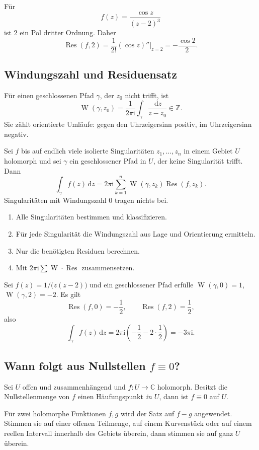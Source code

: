 \documentclass[11pt,a4paper]{article}
\newcommand{\C}{\mathbb C}
\newcommand{\Z}{\mathbb Z}
\newcommand{\ii}{\mathrm i}
\newcommand{\dd}{\,\mathrm d}
\newcommand{\Res}{\operatorname{Res}}
\newcommand{\wind}{\operatorname{W}}
\newcommand{\1}{\mathbf 1}
\begin{document}
{\begin{beispielbox}[title={Beispiel: Residuum an einem Pol dritter Ordnung}]
Für
\[
f(z)=\frac{\cos z}{(z-2)^3}
\]
ist $2$ ein Pol dritter Ordnung. Daher
\[
\Res(f,2)=\frac1{2!}(\cos z)''\big|_{z=2}
=-\frac{\cos2}{2}.
\]
\end{beispielbox}

\subsection{Windungszahl und Residuensatz}
Für einen geschlossenen Pfad $\gamma$, der $z_0$ nicht trifft, ist
\[
\wind(\gamma,z_0)
=\frac1{2\pi\ii}\int_\gamma\frac{\dd z}{z-z_0}\in\Z.
\]
Sie zählt orientierte Umläufe: gegen den Uhrzeigersinn positiv, im Uhrzeigersinn
negativ.

\begin{satzbox}[title=Residuensatz]
Sei $f$ bis auf endlich viele isolierte Singularitäten $z_1,\ldots,z_n$ in einem
Gebiet $U$ holomorph und sei $\gamma$ ein geschlossener Pfad in $U$, der keine
Singularität trifft. Dann
\[
\int_\gamma f(z)\dd z
=2\pi\ii\sum_{k=1}^{n}
\wind(\gamma,z_k)\Res(f,z_k).
\]
Singularitäten mit Windungszahl $0$ tragen nichts bei.
\end{satzbox}

\begin{kochrezeptbox}[title=Komplexes Integral mit Residuen]
\begin{enumerate}
\item Alle Singularitäten bestimmen und klassifizieren.
\item Für jede Singularität die Windungszahl aus Lage und Orientierung ermitteln.
\item Nur die benötigten Residuen berechnen.
\item Mit $2\pi\ii\sum \wind\cdot\Res$ zusammensetzen.
\end{enumerate}
\end{kochrezeptbox}

\begin{beispielbox}[title={Beispiel: Integral mit vorgegebenen Windungszahlen}]
Sei $f(z)=1/\bigl(z(z-2)\bigr)$ und ein geschlossener Pfad erfülle
$\wind(\gamma,0)=1$, $\wind(\gamma,2)=-2$. Es gilt
\[
\Res(f,0)=-\frac12,\qquad \Res(f,2)=\frac12,
\]
also
\[
\int_\gamma f(z)\dd z
=2\pi\ii\left(-\frac12-2\cdot\frac12\right)
=-3\pi\ii.
\]
\end{beispielbox}

\subsection{Wann folgt aus Nullstellen \texorpdfstring{$f\equiv0$}{f identisch null}?}
\begin{satzbox}[title=Identitätssatz]
Sei $U$ offen und zusammenhängend und $f:U\to\C$ holomorph. Besitzt die
Nullstellenmenge von $f$ einen Häufungspunkt \emph{in $U$}, dann ist
$f\equiv0$ auf $U$.
\end{satzbox}
Für zwei holomorphe Funktionen $f,g$ wird der Satz auf $f-g$ angewendet. Stimmen
sie auf einer offenen Teilmenge, auf einem Kurvenstück oder auf einem reellen
Intervall innerhalb des Gebiets überein, dann stimmen sie auf ganz $U$ überein.

}
\end{document}

